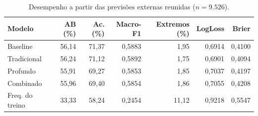 \begin{table}[H]\centering\footnotesize
\caption{Desempenho a partir das previsões externas reunidas ($n=9.526$).}\label{tab:desempenho_final}
\setlength{\tabcolsep}{4.5pt}
\begin{tabular}{@{}lrrrrrr@{}}\toprule
Modelo & AB (\%) & Ac. (\%) & Macro-F1 & Extremos (\%) & LogLoss & Brier \\\midrule
Baseline & 56,14 & 71,37 & 0,5883 & 1,95 & 0,6914 & 0,4100 \\
Tradicional & 56,24 & 71,12 & 0,5892 & 1,75 & 0,6901 & 0,4094 \\
Profundo & 55,91 & 69,27 & 0,5853 & 1,85 & 0,7037 & 0,4197 \\
Combinado & 55,96 & 69,40 & 0,5854 & 1,86 & 0,7055 & 0,4208 \\
Freq. do treino & 33,33 & 58,24 & 0,2454 & 11,12 & 0,9218 & 0,5547 \\\bottomrule
\end{tabular}
\end{table}

